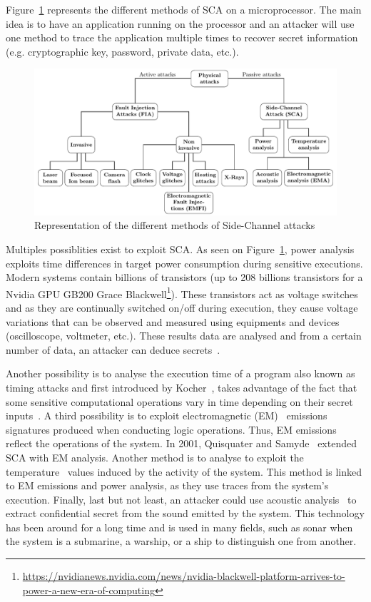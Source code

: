 Figure~\ref{fig:sca} represents the different methods of SCA on a microprocessor. The main idea is to have an application running on the processor and an attacker will use one method to trace the application multiple times to recover secret information (e.g. cryptographic key, password, private data, etc.).

\begin{figure}[ht]
    \centering
    \includegraphics[page=3, width=.75\textwidth]{c2_soa/img/physicalAttacks.pdf}
    \caption{Representation of the different methods of Side-Channel attacks}
    \label{fig:sca}
\end{figure}

Multiples possiblities exist to exploit SCA.
As seen on Figure~\ref{fig:sca}, power analysis exploits time differences in target power consumption during sensitive executions. Modern systems contain billions of transistors (up to 208 billions transistors for a Nvidia GPU GB200 Grace Blackwell\footnote{\url{https://nvidianews.nvidia.com/news/nvidia-blackwell-platform-arrives-to-power-a-new-era-of-computing}}).
These transistors act as voltage switches and as they are continually switched on/off during execution, they cause voltage variations that can be observed and measured using equipments and devices (oscilloscope, voltmeter, etc.). These results data are analysed and from a certain number of data, an attacker can deduce secrets~\cite{KJJ-98-crypto,KJJR-11-jce,GP-99-ches,LKOSECG-21-sp}.

Another possibility is to analyse the execution time of a program also known as timing attacks and first introduced by Kocher~\cite{K-96-crypto}, takes advantage of the fact that some sensitive computational operations vary in time depending on their secret inputs~\cite{DD-05-compnet}.
A third possibility is to exploit electromagnetic (EM)~\cite{ANM-19-di,HMHSS-12-tcrypo,KSTO-17-iccad, WDL-16-ntms,HGTVJ-22-dt} emissions signatures produced when conducting logic operations. Thus, EM emissions reflect the operations of the system. In 2001, Quisquater and Samyde~\cite{QS-01-scps} extended SCA with EM analysis.
Another method is to analyse to exploit the temperature~\cite{HS-14-cardis,AZRHT-21-tvlsi} values induced by the activity of the system. This method is linked to EM emissions and power analysis, as they use traces from the system's execution.
Finally, last but not least, an attacker could use acoustic analysis~\cite{BDGPS-10-usenix,GST-17-crypto,HTM-23-eurospw} to extract confidential secret from the sound emitted by the system. This technology has been around for a long time and is used in many fields, such as sonar when the system is a submarine, a warship, or a ship to distinguish one from another.

